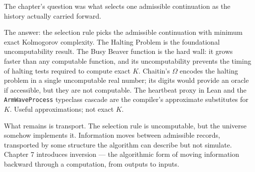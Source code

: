 \begin{bridge}

The chapter's question was what selects one admissible continuation
as the history actually carried forward.

The answer: the selection rule picks the admissible continuation
with minimum exact Kolmogorov complexity. The Halting Problem is
the foundational uncomputability result. The Busy Beaver function
is the hard wall: it grows faster than any computable function, and
its uncomputability prevents the timing of halting tests required
to compute exact $K$. Chaitin's $\Omega$ encodes the halting
problem in a single uncomputable real number; its digits would
provide an oracle if accessible, but they are not computable. The
heartbeat proxy in Lean and the \texttt{ArmWaveProcess} typeclass
cascade are the compiler's approximate substitutes for $K$.
Useful approximations; not exact $K$.

What remains is transport. The selection rule is uncomputable, but
the universe somehow implements it. Information moves between
admissible records, transported by some structure the algorithm
can describe but not simulate. Chapter 7 introduces inversion ---
the algorithmic form of moving information backward through a
computation, from outputs to inputs.

\end{bridge}

